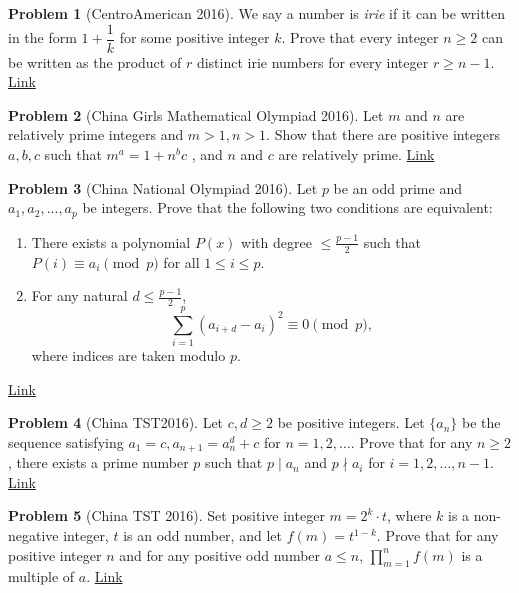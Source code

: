 \documentclass[]{article}
\theoremstyle{definition}
\newtheorem{problem}{Problem}
\begin{document}
\begin{problem}[CentroAmerican 2016]
	We say a number is \textit{irie} if it can be written in the form $1+\dfrac{1}{k}$ for some positive integer $k$. Prove that every integer $n \geq 2$ can be written as the product of $r$ distinct irie numbers for every integer $r \geq n-1$. \hfill \href{http://artofproblemsolving.com/community/c6h1260754p6542783}{Link}
\end{problem}



\begin{problem}[China Girls Mathematical Olympiad 2016]
	Let $m$ and $n$ are relatively prime integers and $m>1,n>1$. Show that there are positive integers $a,b,c$ such that $m^a=1+n^bc$ , and $n$ and $c$ are relatively prime. \hfill \href{http://artofproblemsolving.com/community/c6h1288391p6805896}{Link}
\end{problem}



\begin{problem}[China National Olympiad 2016]
	Let $p$ be an odd prime and $a_1, a_2,...,a_p$ be integers. Prove that the following two conditions are equivalent:
		\begin{enumerate}
			\item There exists a polynomial $P(x)$ with degree $\leq \frac{p-1}{2}$ such that $P(i) \equiv a_i \pmod p$ for all $1 \leq i \leq p$.
			\item For any natural $d \leq \frac{p-1}{2}$,
			$$ \sum_{i=1}^p (a_{i+d} - a_i )^2 \equiv 0 \pmod p,$$
			where indices are taken modulo $p$.
		\end{enumerate}
	\flushright \href{http://artofproblemsolving.com/community/c6h1174698p5660061}{Link}
\end{problem}



\begin{problem}[China TST‌2016]
	Let $c,d \geq 2$ be positive integers. Let $\{a_n\}$ be the sequence satisfying $a_1 = c, a_{n+1} = a_n^d + c$ for $n = 1,2,\dots$.
	Prove that for any $n \geq 2$, there exists a prime number $p$ such that $p\mid a_n$ and $p \nmid a_i$ for $i = 1,2,\dots, n-1$. \hfill \href{http://artofproblemsolving.com/community/c6h1212540p6016827}{Link}
\end{problem}



\begin{problem}[China TST 2016]
	Set positive integer $m=2^k\cdot t$, where $k$ is a non-negative integer, $t$ is an odd number, and let $f(m)=t^{1-k}$. Prove that for any positive integer $n$ and for any positive odd number $a\le n$, $\prod_{m=1}^n f(m)$ is a multiple of $a$. \hfill \href{http://artofproblemsolving.com/community/c6h1215111p6043322}{Link}
\end{problem}
\end{document}
